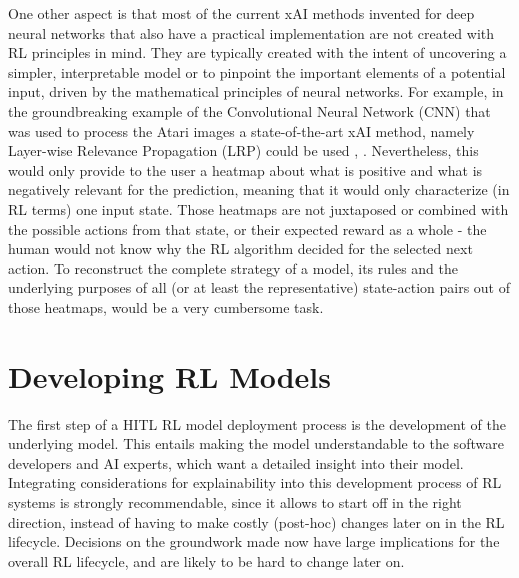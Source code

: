 \documentclass[twoside,11pt]{article}
\begin{document}
One other aspect is that most of the current xAI methods invented for deep neural networks that also have a practical implementation are not created with RL principles in mind. They are typically created with the intent of uncovering a simpler, interpretable model or to pinpoint the important elements of a potential input, driven by the mathematical principles of neural networks. For example, in the groundbreaking example of the Convolutional Neural Network (CNN) that was used to process the Atari images \cite{Mnih:2013:PlayingAtariDeepRL} a state-of-the-art xAI method, namely Layer-wise Relevance Propagation (LRP) could be used \cite{Bach:2015:LayerWiseRelevancePropagation}, \cite{Alber:2019:Innvestigate}. Nevertheless, this would only provide to the user a heatmap about what is positive and what is negatively relevant for the prediction, meaning that it would only characterize (in RL terms) one input state. Those heatmaps are not juxtaposed or combined with the possible actions from that state, or their expected reward as a whole - the human would not know why the RL algorithm decided for the selected next action. To reconstruct the complete strategy of a model, its rules and the underlying purposes of all (or at least the representative) state-action pairs out of those heatmaps, would be a very cumbersome task. 

\section{Developing RL Models}

    
    

The first step of a HITL RL model deployment process is the development of the underlying model. This entails making the model understandable to the software developers and AI experts, which want a detailed insight into their model. 
Integrating considerations for explainability into this development process of RL systems is strongly recommendable, since it allows to start off in the right direction, instead of having to make costly (post-hoc) changes later on in the RL lifecycle. Decisions on the groundwork made now have large implications for the overall RL lifecycle, and are likely to be hard to change later on.
\end{document}
